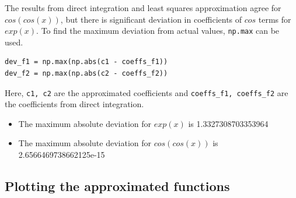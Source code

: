 \documentclass[12pt, a4paper]{article}
\begin{document}
The results from direct integration and least squares approximation agree for $cos(cos(x))$, but there is significant deviation in coefficients of $cos$ terms for $exp(x)$. To find the maximum deviation from actual values, \texttt{np.max} can be used.
\begin{lstlisting}
dev_f1 = np.max(np.abs(c1 - coeffs_f1))
dev_f2 = np.max(np.abs(c2 - coeffs_f2))
\end{lstlisting}
Here, \texttt{c1, c2} are the approximated coefficients and \texttt{coeffs\_f1, coeffs\_f2} are the coefficients from direct integration.
\begin{itemize}
\item The maximum absolute deviation for $exp(x)$ is 1.3327308703353964
\item The maximum absolute deviation for $cos(cos(x))$ is 2.6566469738662125e-15
\end{itemize}

\subsection{Plotting the approximated functions}
\end{document}
